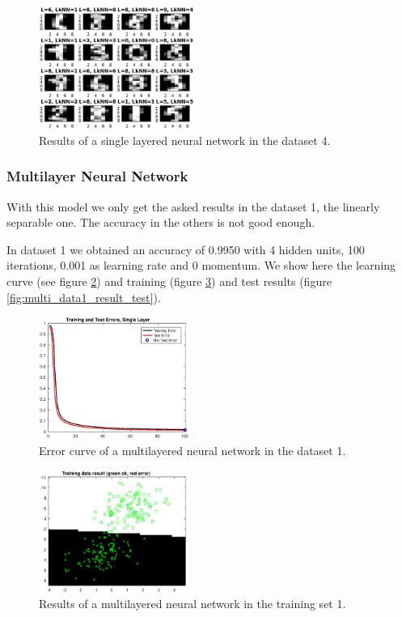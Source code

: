 \documentclass{article}
\begin{document}
\begin{figure}[H]
\centering
\includegraphics[height=4cm]{images/single_data4_result}
\caption{Results of a single layered neural network in the dataset 4.}
\label{fig:single_data4_result}
\end{figure}


\subsubsection{Multilayer Neural Network}

With this model we only get the asked results in the dataset 1, the linearly separable one. The accuracy in the others is not good enough.

In dataset 1 we obtained an accuracy of 0.9950 with 4 hidden units, 100 iterations, 0.001 as learning rate and 0 momentum. We show here the learning curve (see figure \ref{fig:multi_data1_error}) and training (figure \ref{fig:multi_data1_result_train}) and test results (figure \ref{fig:multi_data1_result_test}).

\begin{figure}[H]
\centering
\includegraphics[height=4cm]{images/multi_data1_error}
\caption{Error curve of a multilayered neural network in the dataset 1.}
\label{fig:multi_data1_error}
\end{figure}

\begin{figure}[H]
\centering
\includegraphics[height=4cm]{images/multi_data1_result_train}
\caption{Results of a multilayered neural network in the training set 1.}
\label{fig:multi_data1_result_train}
\end{figure}
\end{document}
